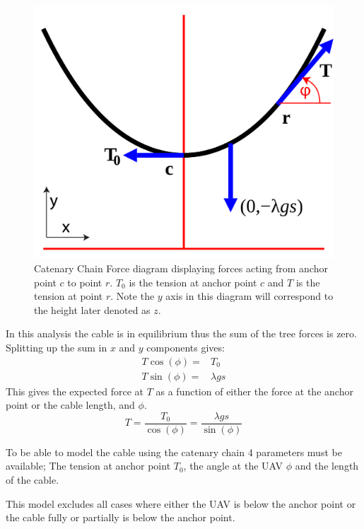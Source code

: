 \begin{figure}[hbtp]
\centering
\includegraphics[scale=0.25]{graphics/CatenaryForceDiagram.png}
\caption[Catenary Chain Force diagram]{Catenary Chain Force diagram displaying forces acting from anchor point $c$ to point $r$. $T_0$ is the tension at anchor point $c$ and $T$ is the tension at point $r$. Note the $y$ axis in this diagram will correspond to the height later denoted as $z$.}
\label{fig:catenary_force_diagram}
\end{figure}

\noindent
In this analysis the cable is in equilibrium thus the sum of the tree forces is zero. Splitting up the sum in $x$ and $y$ components gives:
\begin{eqnarray}
T\cos(\phi) =& T_0 \\
T \sin(\phi) =& \lambda g s
\end{eqnarray}
This gives the expected force at $T$ as a function of either the force at the anchor point or the cable length, and $\phi$.
\begin{equation}
T = \frac{T_0}{\cos(\phi)} = \frac{\lambda g s}{\sin(\phi)}
\end{equation}

\noindent
To be able to model the cable using the catenary chain 4 parameters must be available; The tension at anchor point $T_0$, the angle at the UAV $\phi$ and the length of the cable.

\noindent
This model excludes all cases where either the UAV is below the anchor point or the cable fully or partially is below the anchor point.



